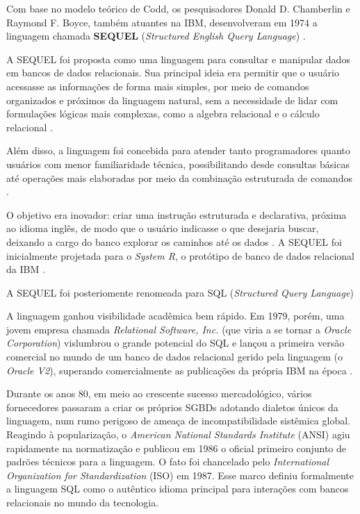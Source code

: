 Com base no modelo teórico de Codd, os pesquisadores Donald D. Chamberlin e Raymond F. Boyce, também atuantes na IBM, desenvolveram em 1974 a linguagem chamada \textbf{SEQUEL} (\textit{Structured English Query Language}) \cite{sequel}. 

A SEQUEL foi proposta como uma linguagem para consultar e manipular dados em bancos de dados relacionais. Sua principal ideia era permitir que o usuário acessasse as informações de forma mais simples, por meio de comandos organizados e próximos da linguagem natural, sem a necessidade de lidar com formulações lógicas mais complexas, como a algebra relacional e o cálculo relacional \cite{sequel, chamberlin2012early}. 

Além disso, a linguagem foi concebida para atender tanto programadores quanto usuários com menor familiaridade técnica, possibilitando desde consultas básicas até operações mais elaboradas por meio da combinação estruturada de comandos \cite{sequel, chamberlin2012early}.

O objetivo era inovador: criar uma instrução estruturada e declarativa, próxima ao idioma inglês, de modo que o usuário indicasse o que desejaria buscar, deixando a cargo do banco explorar os caminhos até os dados \cite{sequel, chamberlin2012early}. A SEQUEL foi inicialmente projetada para o \textit{System R}, o protótipo de banco de dados relacional da IBM \cite{sequel, chamberlin2012early}.

A SEQUEL foi posteriomente renomeada para SQL (\textit{Structured Query Language}) \cite{chamberlin2012early}

A linguagem ganhou visibilidade acadêmica bem rápido. Em 1979, porém, uma jovem empresa chamada \textit{Relational Software, Inc.} (que viria a se tornar a \textit{Oracle Corporation}) vislumbrou o grande potencial do SQL e lançou a primeira versão comercial no mundo de um banco de dados relacional gerido pela linguagem (o \textit{Oracle V2}), superando comercialmente as publicações da própria IBM na época \cite{oracle_sql_history}.

Durante os anos 80, em meio ao crescente sucesso mercadológico, vários fornecedores passaram a criar os próprios SGBDs adotando dialetos únicos da linguagem, num rumo perigoso de ameaça de incompatibilidade sistêmica global. Reagindo à popularização, o \textit{American National Standards Institute} (ANSI) agiu rapidamente na normatização e publicou em 1986 o oficial primeiro conjunto de padrões técnicos para a linguagem. O fato foi chancelado pelo \textit{International Organization for Standardization} (ISO) em 1987. Esse marco definiu formalmente a linguagem SQL como o autêntico idioma principal para interações com bancos relacionais no mundo da tecnologia.

